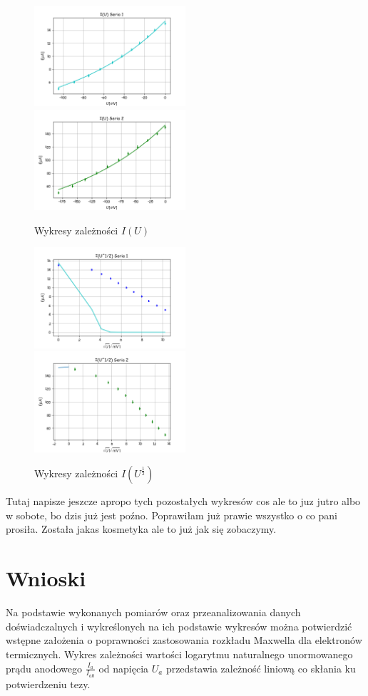 \documentclass[a4paper,10pt]{article}
\begin{document}
\begin{figure}[H]
\includegraphics[width=0.5\textwidth]{zarzenieU1.png}
\includegraphics[width=0.5\textwidth]{zarzenieU2.png}
\caption{Wykresy zależności $I(U)$}
\end{figure}

\begin{figure}[H]
 \includegraphics[width=0.5\textwidth]{zarzenieU12.png}
 \includegraphics[width=0.5\textwidth]{zarzenieU22.png}
 \caption{Wykresy zależności $I(U^{\frac{1}{2}})$}
 \end{figure}

Tutaj napisze jeszcze apropo tych pozostałych wykresów cos ale to juz jutro albo w sobote, bo dzis już jest poźno. Poprawiłam już prawie wszystko o co pani prosiła. Została jakas kosmetyka ale to już jak się zobaczymy.

\section{Wnioski}
 Na podstawie wykonanych pomiarów oraz przeanalizowania danych doświadczalnych i wykreślonych na ich podstawie wykresów można potwierdzić wstępne założenia o poprawności zastosowania rozkładu Maxwella dla elektronów termicznych. Wykres zależności wartości logarytmu naturalnego unormowanego prądu anodowego $\frac{I_a}{I_{a0}}$ od napięcia $U_a$ przedstawia zależność liniową co skłania ku potwierdzeniu tezy.
 
\end{document}
